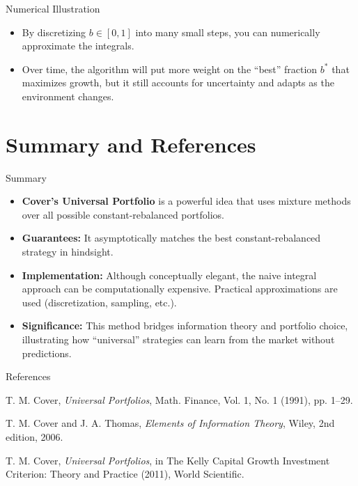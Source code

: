 \documentclass{beamer}
\begin{document}
\begin{frame}{Numerical Illustration}
  \begin{itemize}
    \item By discretizing \(b \in [0,1]\) into many small steps, you can numerically approximate the integrals.
    \item Over time, the algorithm will put more weight on the “best” fraction \(b^*\) that maximizes growth, 
          but it still accounts for uncertainty and adapts as the environment changes.
  \end{itemize}
\end{frame}

\section{Summary and References}
\begin{frame}{Summary}
  \begin{itemize}
    \item \textbf{Cover's Universal Portfolio} is a powerful idea that uses mixture methods over all possible 
          constant-rebalanced portfolios.
    \item \textbf{Guarantees:} It asymptotically matches the best constant-rebalanced strategy in hindsight.
    \item \textbf{Implementation:} Although conceptually elegant, the naive integral approach can be computationally 
          expensive. Practical approximations are used (discretization, sampling, etc.).
    \item \textbf{Significance:} This method bridges information theory and portfolio choice, 
          illustrating how “universal” strategies can learn from the market without predictions.
  \end{itemize}
\end{frame}

\begin{frame}{References}
  \footnotesize
  \begin{thebibliography}{9}
      T. M. Cover,
      \emph{Universal Portfolios},
      Math. Finance, Vol. 1, No. 1 (1991), pp. 1--29.
      
      T. M. Cover and J. A. Thomas,
      \emph{Elements of Information Theory},
      Wiley, 2nd edition, 2006.

      T. M. Cover,
      \emph{Universal Portfolios}, 
      in The Kelly Capital Growth Investment Criterion: Theory and Practice (2011), World Scientific.
  \end{thebibliography}
\end{frame}
\end{document}

